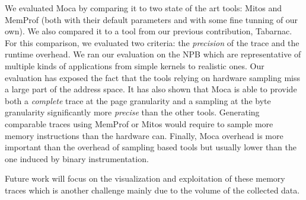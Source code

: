 We evaluated \gls{Moca} by comparing it to two state of the art tools: \gls{Mitos} and
\gls{MemProf} (both with their default parameters and with some fine tunning of our own). We also compared it to a
tool from our previous contribution, \gls{Tabarnac}. For this comparison, we evaluated
two criteria: the \emph{precision} of the trace and the runtime overhead. We ran our
evaluation on the \gls{NPB} which are representative of multiple kinds of applications from simple kernels
to realistic ones. Our evaluation has exposed the fact that the tools
relying on hardware sampling miss a large part of the address space. It
has also shown that \gls{Moca} is able to provide both a \emph{complete} trace at the page
granularity and a sampling at the byte granularity significantly more \emph{precise} than the
other tools. Generating comparable traces using \gls{MemProf} or \gls{Mitos} would
require to sample more memory instructions than the hardware can.
Finally, \gls{Moca} overhead is more important than the overhead of sampling
based tools but usually lower than the one induced by binary instrumentation.

Future work will focus on the visualization and exploitation of these memory traces
which is another challenge mainly due to the volume of the collected data.

